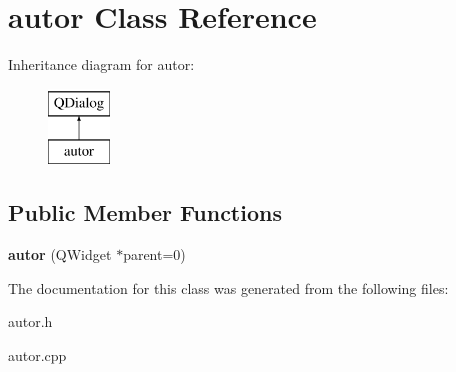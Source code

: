 \hypertarget{classautor}{}\section{autor Class Reference}
\label{classautor}
Inheritance diagram for autor\+:\begin{figure}[H]
\begin{center}
\leavevmode
\includegraphics[height=2.000000cm]{classautor}
\end{center}
\end{figure}
\subsection*{Public Member Functions}
\begin{DoxyCompactItemize}
\item 
\mbox{\label{classautor_a83ce50c391a01b97decc7a0e9651eb80}} 
{\bfseries autor} (Q\+Widget $\ast$parent=0)
\end{DoxyCompactItemize}


The documentation for this class was generated from the following files\+:\begin{DoxyCompactItemize}
\item 
autor.\+h\item 
autor.\+cpp\end{DoxyCompactItemize}
